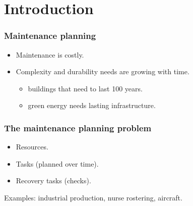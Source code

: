 \section{Introduction}

\begin{frame}
\frametitle{\textbf{Maintenance planning}}

  \begin{itemize}[<+->]
  \item
    Maintenance is costly.
  \item
    Complexity and durability needs are growing with time.

    \begin{itemize}[<+->]
    
    \item
      buildings that need to last 100 years.
    \item
      green energy needs lasting infrastructure.
    \end{itemize}
  \end{itemize}
\end{frame}

\begin{frame}
\frametitle{\textbf{The maintenance planning problem}}

  \pause

  \begin{itemize}[<+->]

  \item Resources.
  \item Tasks (planned over time).
  \item Recovery tasks (checks).
  \end{itemize}
  
  \pause
  Examples: industrial production, nurse rostering, aircraft.
\end{frame}

